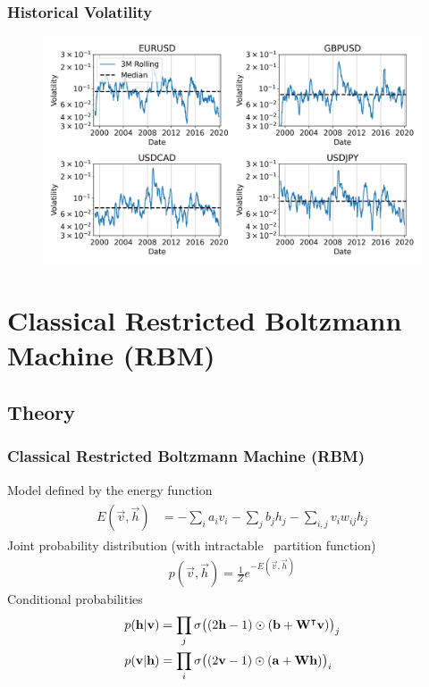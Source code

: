 \documentclass{beamer}
\begin{document}
\begin{frame}
    \frametitle{Historical Volatility}
    \begin{figure}
        \includegraphics[width=1\linewidth]{data_analysis/rolling_volatility.png}
    \end{figure}
\end{frame}



\section{Classical Restricted Boltzmann Machine (RBM)}

\subsection{Theory}
\begin{frame}
    \frametitle{Classical Restricted Boltzmann Machine (RBM)}
    Model defined by the energy function~\cite{goodfellow_deep_learning}
    \begin{align}
    \begin{split}
        E(\vec{v}, \vec{h})
            &= -\sum_i a_i v_i - \sum_j b_j h_j - \sum_{i,j} v_i w_{ij} h_j
    \end{split}
    \end{align}
    Joint probability distribution (with intractable~\cite{long_servedio_2010} partition function)
    \begin{align}
        p(\vec{v}, \vec{h}) = \frac{1}{Z} e^{-E(\vec{v},\vec{h})}
    \end{align}
    Conditional probabilities
    \begin{align}
    \begin{split}
        p(\mathbf{h} | \mathbf{v})
            &= \prod_j \sigma\big( (2\mathbf{h} - 1) \odot (\mathbf{b} + \mathbf{W}^\intercal\mathbf{v}) \big)_j \\
        p(\mathbf{v} | \mathbf{h})
            &= \prod_i \sigma\big( (2\mathbf{v} - 1) \odot (\mathbf{a} + \mathbf{W}\mathbf{h}) \big)_i
    \end{split}
    \end{align}
\end{frame}
\end{document}
